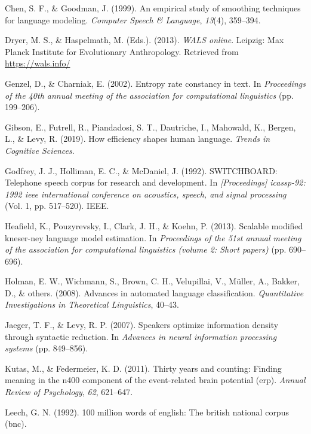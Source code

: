 \documentclass[10pt, letterpaper]{article}
\begin{document}
\leavevmode\hypertarget{ref-chen1999}{}%
Chen, S. F., \& Goodman, J. (1999). An empirical study of smoothing
techniques for language modeling. \emph{Computer Speech \& Language},
\emph{13}(4), 359--394.

\leavevmode\hypertarget{ref-2013}{}%
Dryer, M. S., \& Haspelmath, M. (Eds.). (2013). \emph{WALS online}.
Leipzig: Max Planck Institute for Evolutionary Anthropology. Retrieved
from \url{https://wals.info/}

\leavevmode\hypertarget{ref-genzel2002}{}%
Genzel, D., \& Charniak, E. (2002). Entropy rate constancy in text. In
\emph{Proceedings of the 40th annual meeting of the association for
computational linguistics} (pp. 199--206).

\leavevmode\hypertarget{ref-gibson2019}{}%
Gibson, E., Futrell, R., Piandadosi, S. T., Dautriche, I., Mahowald, K.,
Bergen, L., \& Levy, R. (2019). How efficiency shapes human language.
\emph{Trends in Cognitive Sciences}.

\leavevmode\hypertarget{ref-godfrey1992}{}%
Godfrey, J. J., Holliman, E. C., \& McDaniel, J. (1992). SWITCHBOARD:
Telephone speech corpus for research and development. In
\emph{{[}Proceedings{]} icassp-92: 1992 ieee international conference on
acoustics, speech, and signal processing} (Vol. 1, pp. 517--520). IEEE.

\leavevmode\hypertarget{ref-heafield2013}{}%
Heafield, K., Pouzyrevsky, I., Clark, J. H., \& Koehn, P. (2013).
Scalable modified kneser-ney language model estimation. In
\emph{Proceedings of the 51st annual meeting of the association for
computational linguistics (volume 2: Short papers)} (pp. 690--696).

\leavevmode\hypertarget{ref-holman2008}{}%
Holman, E. W., Wichmann, S., Brown, C. H., Velupillai, V., Müller, A.,
Bakker, D., \& others. (2008). Advances in automated language
classification. \emph{Quantitative Investigations in Theoretical
Linguistics}, 40--43.

\leavevmode\hypertarget{ref-jaeger2007}{}%
Jaeger, T. F., \& Levy, R. P. (2007). Speakers optimize information
density through syntactic reduction. In \emph{Advances in neural
information processing systems} (pp. 849--856).

\leavevmode\hypertarget{ref-kutas2011}{}%
Kutas, M., \& Federmeier, K. D. (2011). Thirty years and counting:
Finding meaning in the n400 component of the event-related brain
potential (erp). \emph{Annual Review of Psychology}, \emph{62},
621--647.

\leavevmode\hypertarget{ref-leech1992}{}%
Leech, G. N. (1992). 100 million words of english: The british national
corpus (bnc).
\end{document}
